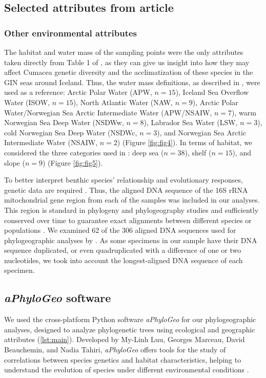 \subsection{Selected attributes from article \cite{uhlir_adding_2021}} 
\subsubsection{Other environmental attributes} 
The habitat and water mass of the sampling points were the only attributes taken directly from Table 1 of \citep{uhlir_adding_2021}, as they can give us insight into how they may affect Cumacea genetic diversity and the acclimatization of these species in the GIN seas around Iceland. Thus, the water mass definitions, as described in \citep{uhlir_adding_2021}, were used as a reference: Arctic Polar Water (APW, $n=15$), Iceland Sea Overflow Water (ISOW, $n=15$), North Atlantic Water (NAW, $n=9$), Arctic Polar Water/Norwegian Sea Arctic Intermediate Water (APW/NSAIW, $n=7$), warm Norwegian Sea Deep Water (NSDWw, $n=8$), Labrador Sea Water (LSW, $n=3$), cold Norwegian Sea Deep Water (NSDWc, $n=3$), and Norwegian Sea Arctic Intermediate Water (NSAIW, $n=2$) (Figure \ref{fig:fig4}). In terms of habitat, we considered the three categories used in \citep{uhlir_adding_2021}: deep sea ($n=38$), shelf ($n=15$), and slope ($n=9$) (Figure \ref{fig:fig5}).

To better interpret benthic species' relationship and evolutionary responses, genetic data are required \citep{wilson_speciation_1987, uhlir_adding_2021}. Thus, the aligned DNA sequence of the 16S rRNA mitochondrial gene region from each of the samples was included in our analyses. This region is standard in phylogeny and phylogeography studies \citep{hugenholtz1998impact} and sufficiently conserved over time to guarantee exact alignments between different species or populations \citep{saccone1999evolutionary}. We examined 62 of the 306 aligned DNA sequences used for phylogeographic analyses by \citep{uhlir_adding_2021}. As some specimens in our sample have their DNA sequence duplicated, or even quadruplicated with a difference of one or two nucleotides, we took into account the longest-aligned DNA sequence of each specimen.

\subsection{{\textit{aPhyloGeo} software}\label{aPhyloGeo-software}}
We used the cross-platform Python software \textit{aPhyloGeo} for our phylogeographic analyses, designed to analyze phylogenetic trees using ecological and geographic attributes (\autoref{lst:main}). Developed by My-Linh Luu, Georges Marceau, David Beauchemin, and Nadia Tahiri, \textit{aPhyloGeo} offers tools for the study of correlations between species genetics and habitat characteristics, helping to understand the evolution of species under different environmental conditions \citep{koshkarov_phylogeography_2022}. 


